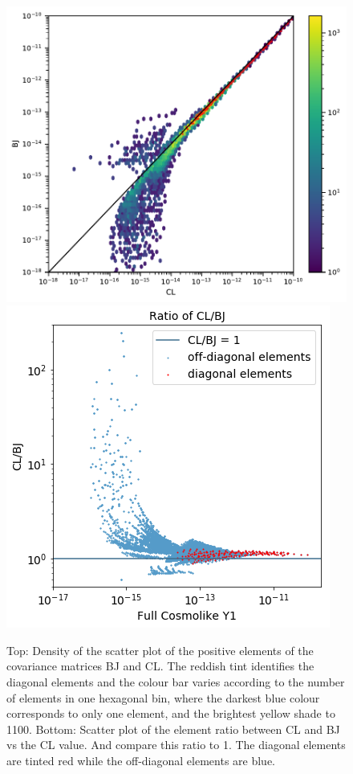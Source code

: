 \documentclass[twocolumn]{\docclass}
\begin{document}
	\begin{figure}
		\includegraphics[width=0.9\columnwidth]{One-to-one-Y1_CL-BJ.pdf}
		\includegraphics[width=0.8\columnwidth]{ratio_scatter.png}
		\caption{Top: Density of the scatter plot of the positive elements of the covariance matrices BJ and CL. The reddish tint identifies the diagonal elements and the colour bar varies according to the number of elements in one hexagonal bin, where the darkest blue colour corresponds to only one element, and the brightest yellow shade to 1100. Bottom: Scatter plot of the element ratio between CL and BJ vs the CL value. And compare this ratio to 1. The diagonal elements are tinted red while the off-diagonal elements are blue.
			\label{fig:one-to-one}}
	\end{figure}
	
\end{document}
